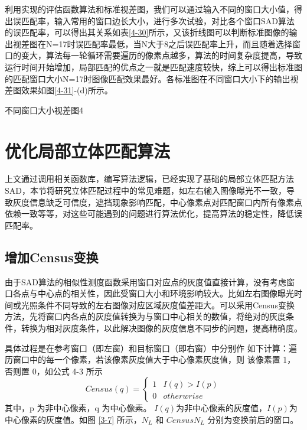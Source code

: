 利用实现的评估函数算法和标准视差图，我们可以通过输入不同的窗口大小值，得出误匹配率，输入常用的窗口边长大小，进行多次试验，对比各个窗口SAD算法的误匹配率，可以得出其关系如表\ref{4-30}所示，又该折线图可以判断标准图像的输出视差图在N=17时误匹配率最低，当N大于8之后误匹配率上升，而且随着选择窗口的变大，算法每一轮循环需要遍历的像素点越多，算法的时间复杂度提高，导致运行时间开始增加，局部匹配的优点之一就是匹配速度较快，综上可以得出标准图的匹配窗口大小N=17时图像匹配效果最好。各标准图在不同窗口大小下的输出视差图效果如图\ref{4-31}-(d)所示。

\begin{pics}[h]{不同窗口大小视差图}{4}
\end{pics}

\section{优化局部立体匹配算法}

上文通过调用相关函数库，编写算法逻辑，已经实现了基础的局部立体匹配方法SAD，本节将研究立体匹配过程中的常见难题，如左右输入图像曝光不一致，导致灰度信息缺乏可信度，遮挡现象影响匹配，中心像素点对匹配窗口内所有像素点依赖一致等等，对这些可能遇到的问题进行算法优化，提高算法的稳定性，降低误匹配率。

\subsection{增加Census变换}


由于SAD算法的相似性测度函数采用窗口对应点的灰度值直接计算，没有考虑窗口各点与中心点的相关性，因此受窗口大小和环境影响较大。比如左右图像曝光时间或光照条件不同导致的左右图像对应区域灰度值差距大。可以采用Census变换方法，先将窗口内各点的灰度值转换为与窗口中心相关的数值，将绝对的灰度条件，转换为相对灰度条件，以此解决图像的灰度信息不同步的问题，提高精确度。

具体过程是在参考窗口（即左窗）和目标窗口（即右窗）中分别作
如下计算：遍历窗口中的每一个像素，若该像素灰度值大于中心像素灰度值，则
该像素置 1，否则置 0，如公式 4-3 所示
\begin{equation}
Census(q)=\left\{\begin{matrix}
1 & I(q)>I(p) \\ 
0 & otherwrise 
\end{matrix}\right.
\end{equation}
其中，p 为非中心像素，q 为中心像素。 $I(q)$为非中心像素的灰度值，$ I(p)$为
中心像素的灰度值。如图 \ref{3-7} 所示，$N_{L}$ 和 $CensusN_{L}$ 分别为变换前后的窗口。

